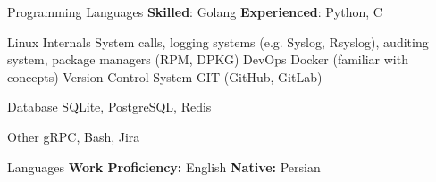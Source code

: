 

\begin{cvskills}


  \cvskill
    {Programming Languages} %
    {\textbf{Skilled}: Golang \qquad \textbf{Experienced}: Python, C } %

  \cvskill
    {Linux Internals} %
    {System calls, logging systems (e.g. Syslog, Rsyslog), auditing system, package managers (RPM, DPKG)} %
  \cvskill
    {DevOps} %
    {Docker (familiar with concepts)} %
  \cvskill
    {Version Control System} %
    {GIT (GitHub, GitLab)} %

  \cvskill
    {Database} %
    {SQLite, PostgreSQL, Redis} %

  \cvskill
    {Other} %
    {gRPC, Bash, Jira} %

  \cvskill
    {Languages} %
    {\textbf{Work Proficiency:} English \qquad \textbf{Native:} Persian} %

\end{cvskills}
